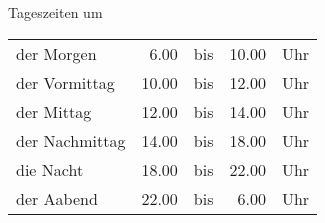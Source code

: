 \begin{semantics}{Tageszeiten}{}
um \fillhere \\

\begin{tabular}{lrlrl}
	der Morgen		& 6.00  & bis & 10.00 & Uhr \\
	der Vormittag	& 10.00 & bis & 12.00 & Uhr \\
	der Mittag		& 12.00 & bis & 14.00 & Uhr \\
	der Nachmittag	& 14.00 & bis & 18.00 & Uhr \\
	die Nacht		& 18.00 & bis & 22.00 & Uhr \\
	der Aabend		& 22.00 & bis & 6.00  & Uhr
\end{tabular}
\end{semantics}
